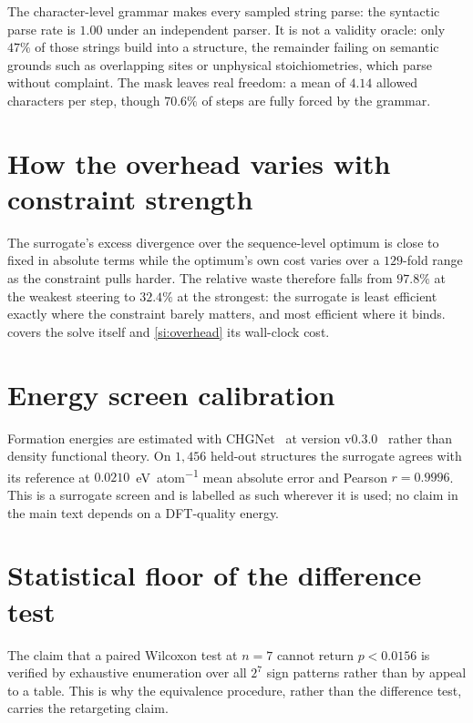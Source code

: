 The character-level grammar makes every sampled string parse: the syntactic parse rate
is $1.00$ under an independent parser. It is not a validity oracle: only $47\%$ of
those strings build into a structure, the remainder failing on semantic grounds such as
overlapping sites or unphysical stoichiometries, which parse without complaint. The mask
leaves real freedom: a mean of $4.14$ allowed characters per step, though $70.6\%$ of
steps are fully forced by the grammar.

\section{How the overhead varies with constraint strength}
\label{si:frontier}

The surrogate's excess divergence over the sequence-level optimum is close to fixed in
absolute terms while the optimum's own cost varies over a $129$-fold range as the
constraint pulls harder. The relative waste therefore falls from $97.8\%$ at the weakest
steering to $32.4\%$ at the strongest: the surrogate is least efficient exactly where the
constraint barely matters, and most efficient where it binds.  covers the
solve itself and \cref{si:overhead} its wall-clock cost.

\section{Energy screen calibration}
\label{si:energy}

Formation energies are estimated with CHGNet~\citep{deng2023chgnet} at
version v0.3.0~\citep{chgnet_v030} rather than density functional theory. On $1{,}456$ held-out structures the surrogate agrees with its reference at
$0.0210$~\unit{\electronvolt\per atom} mean absolute error and Pearson $r = 0.9996$.
This is a surrogate screen and is labelled as such wherever it is used; no claim in the
main text depends on a DFT-quality energy.

\section{Statistical floor of the difference test}
\label{si:floor}

The claim that a paired Wilcoxon test at $n = 7$ cannot return $p < 0.0156$ is verified
by exhaustive enumeration over all $2^{7}$ sign patterns rather than by appeal to a
table. This is why the equivalence procedure, rather than the
difference test, carries the retargeting claim.

